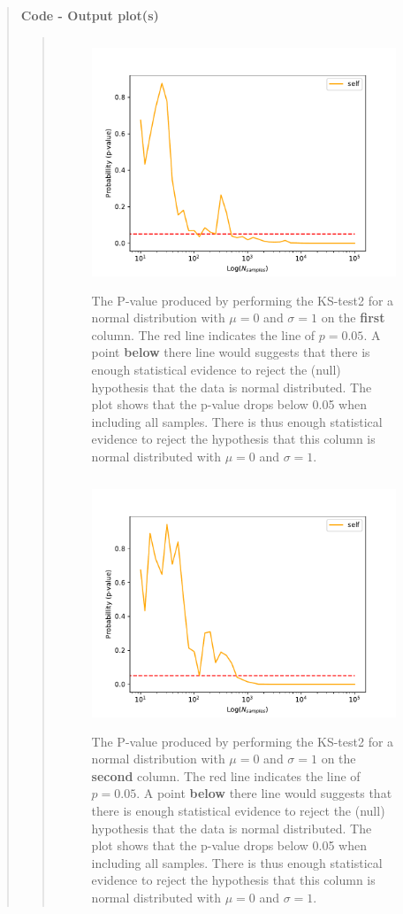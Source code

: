 \begin{quote}
\textbf{Code - Output plot(s)}
\begin{quote}
\begin{figure}[!ht]
\centering
\includegraphics[width=12cm, height=7.5cm]{./Plots/1e_plot_column_0.pdf}
\caption{The P-value produced by performing the KS-test2 for a normal distribution with $\mu = 0$ and $\sigma = 1$ on the \textbf{first} column.  The red line indicates the line of $ p = 0.05$. A point \textbf{below} there  line would suggests that there is enough statistical evidence to reject the (null) hypothesis that the data is normal distributed. The plot shows that the p-value drops below 0.05 when including all samples. There is thus enough statistical evidence to reject the hypothesis that this column is normal distributed with $\mu = 0$ and $\sigma = 1$.}
\end{figure}

\begin{figure}[!ht]
\centering
\includegraphics[width=12cm, height=7.5cm]{./Plots/1e_plot_column_1.pdf}
\caption{The P-value produced by performing the KS-test2 for a normal distribution with $\mu = 0$ and $\sigma = 1$ on the \textbf{second} column.  The red line indicates the line of $ p = 0.05$. A point \textbf{below} there  line would suggests that there is enough statistical evidence to reject the (null) hypothesis that the data is normal distributed. The plot shows that the p-value drops below 0.05 when including all samples. There is thus enough statistical evidence to reject the hypothesis that this column is normal distributed with $\mu = 0$ and $\sigma = 1$.}
\end{figure}
\newpage


\end{quote}
\end{quote}
